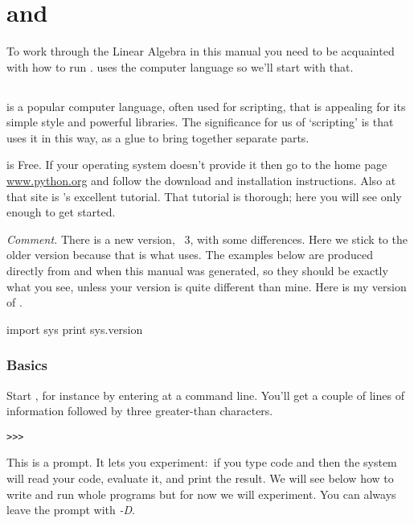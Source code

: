 \chapter{\python{} and \Sage{}}

To work through the Linear Algebra in this manual
you need to be acquainted with how to run \Sage. 
\Sage{} uses the computer language \python{} so we'll start with that.


\section{\python}
\python{} is a popular computer language, often used for scripting,
that is appealing for its simple style and powerful libraries.
The significance for us of `scripting' is that \Sage{} uses it in this way,
as a glue to bring together separate parts.

\python{} is Free.
If your operating system doesn't provide it then go to the home 
page \href{http://www.python.org}{\url{www.python.org}} and follow the
download and installation instructions.
Also at that site is \python's excellent tutorial.
That tutorial is thorough; 
here you will see only enough \python{} to get started.

\smallskip
\textit{Comment.}
There is a new version, \python~3, with some differences.
Here we stick to the older version 
because that is what \Sage{} uses.
The examples below are produced directly 
from \python{} and \Sage{} when this manual was generated, so they should be 
exactly what you see, unless your version is quite different than mine.
Here is my version of \python. 
\begin{pythonoutput}
import sys
print sys.version
\end{pythonoutput}

\subsection{Basics}
Start \python, for instance by entering 
at a command line.
You'll get a couple of lines of 
information followed by three greater-than
characters.
\begin{lstlisting}[style=python]
>>>   
\end{lstlisting}
This is a prompt.
It lets you experiment:~if you type 
\python{} code and  then the system
will read your code, evaluate it, and print the result.
We will see below how to write and run whole programs
but for now we will experiment.
You can always leave the prompt with \textit{-D}.

